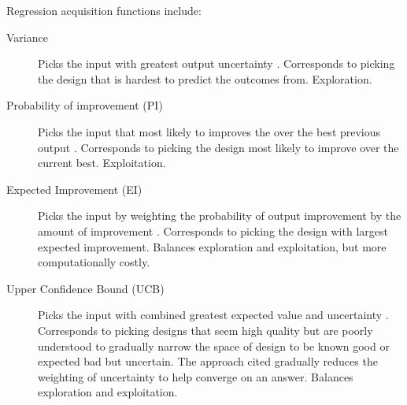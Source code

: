 \documentclass{sig-alternate}
\begin{document}
Regression acquisition functions include:
\begin{description}
\item[Variance] Picks the input with greatest output uncertainty \cite{brochu2010:thesis}. 
Corresponds to picking the design that is hardest to predict the outcomes from. 
Exploration.
%
\item[Probability of improvement (PI)] Picks the input that most likely to improves the over the best previous output \cite{brochu2010:thesis}. 
Corresponds to picking the design most likely to improve over the current best. 
Exploitation.
%
\item[Expected Improvement (EI)] Picks the input by weighting the probability of output improvement by the amount of improvement \cite{brochu2010:thesis}.
Corresponds to picking the design with largest expected improvement.
Balances exploration and exploitation, but more computationally costly.
%
\item[Upper Confidence Bound (UCB)] Picks the input with combined greatest expected value and uncertainty \cite{srinivas2010:gp-ucb}.
Corresponds to picking designs that seem high quality but are poorly understood to gradually narrow the space of design to be known good or expected bad but uncertain.
The approach cited gradually reduces the weighting of uncertainty to help converge on an answer.
Balances exploration and exploitation.
\end{description}


\end{document}
